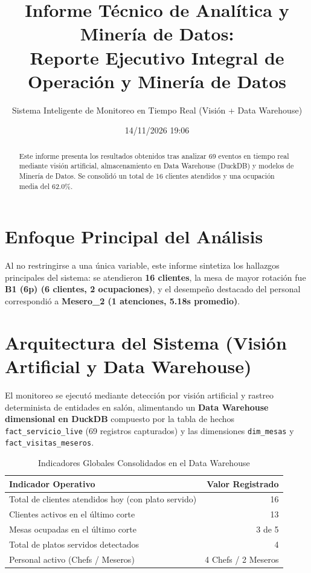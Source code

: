 \documentclass[12pt,a4paper]{article}
\title{\textbf{Informe Técnico de Analítica y Minería de Datos:\\ Reporte Ejecutivo Integral de Operación y Minería de Datos}}
\author{Sistema Inteligente de Monitoreo en Tiempo Real (Visión + Data Warehouse)}
\date{14/11/2026 19:06}
\begin{document}
\maketitle

\begin{abstract}
Este informe presenta los resultados obtenidos tras analizar 69 eventos en tiempo real mediante visión artificial, almacenamiento en Data Warehouse (DuckDB) y modelos de Minería de Datos. Se consolidó un total de 16 clientes atendidos y una ocupación media del 62.0\%.
\end{abstract}

\section{Enfoque Principal del Análisis}
Al no restringirse a una única variable, este informe sintetiza los hallazgos principales del sistema: se atendieron \textbf{16 clientes}, la mesa de mayor rotación fue \textbf{B1 (6p) (6 clientes, 2 ocupaciones)}, y el desempeño destacado del personal correspondió a \textbf{Mesero\_2 (1 atenciones, 5.18s promedio)}.

\section{Arquitectura del Sistema (Visión Artificial y Data Warehouse)}
El monitoreo se ejecutó mediante detección por visión artificial y rastreo determinista de entidades en salón, alimentando un \textbf{Data Warehouse dimensional en DuckDB} compuesto por la tabla de hechos \texttt{fact\_servicio\_live} (69 registros capturados) y las dimensiones \texttt{dim\_mesas} y \texttt{fact\_visitas\_meseros}.

\begin{table}[H]
\centering
\caption{Indicadores Globales Consolidados en el Data Warehouse}
\begin{tabular}{lr}
\toprule
\textbf{Indicador Operativo} & \textbf{Valor Registrado} \\
\midrule
Total de clientes atendidos hoy (con plato servido) & 16 \\
Clientes activos en el último corte & 13 \\
Mesas ocupadas en el último corte & 3 de 5 \\
Total de platos servidos detectados & 4 \\
Personal activo (Chefs / Meseros) & 4 Chefs / 2 Meseros \\
\bottomrule
\end{tabular}
\end{table}
\end{document}
